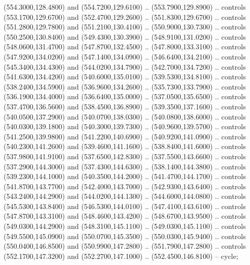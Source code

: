 {\begin{scope}[y=0.80pt, x=0.80pt, yscale=-1, xscale=1, inner sep=0pt, outer sep=0pt, #1]
      (554.3000,128.4800) and (554.7200,129.6100) .. (553.7900,129.8900) .. controls
      (553.1700,129.6700) and (552.4700,129.2600) .. (551.8300,129.6700) .. controls
      (551.2800,129.7800) and (551.2100,130.4100) .. (550.9000,130.7300) .. controls
      (550.2500,130.8400) and (549.4300,130.3900) .. (548.9100,131.0200) .. controls
      (548.0600,131.4700) and (547.8700,132.4500) .. (547.8000,133.3100) .. controls
      (547.9200,134.0200) and (547.1400,134.0900) .. (546.6400,134.2100) .. controls
      (545.3400,134.4300) and (544.0200,134.7900) .. (542.7000,134.7200) .. controls
      (541.6300,134.4200) and (540.6000,135.0100) .. (539.5300,134.8100) .. controls
      (538.2400,134.5900) and (536.9600,134.2600) .. (535.7300,133.7900) .. controls
      (536.1900,134.4000) and (536.6400,135.0000) .. (537.0500,135.6500) .. controls
      (537.4700,136.5600) and (538.4500,136.8900) .. (539.3500,137.1600) .. controls
      (540.0500,137.2900) and (540.0700,138.0300) .. (540.0800,138.6000) .. controls
      (540.0300,139.1800) and (540.3000,139.7300) .. (540.9600,139.5700) .. controls
      (541.2500,139.9800) and (541.2200,140.6900) .. (540.9200,141.0900) .. controls
      (540.2300,141.2600) and (539.4600,141.1600) .. (538.8400,141.6000) .. controls
      (537.9800,141.9100) and (537.6500,142.8300) .. (537.5500,143.6600) .. controls
      (537.2900,144.3000) and (537.4300,144.6300) .. (538.1400,144.3800) .. controls
      (539.2300,144.1000) and (540.3500,144.2000) .. (541.4700,144.1700) .. controls
      (541.8700,143.7700) and (542.4000,143.7000) .. (542.9300,143.6400) .. controls
      (543.2400,144.2900) and (544.0200,144.1300) .. (544.6000,144.0800) .. controls
      (545.5300,143.8400) and (546.5300,144.0100) .. (547.4100,143.6100) .. controls
      (547.8700,143.3100) and (548.4600,143.4200) .. (548.6700,143.9500) .. controls
      (549.0300,144.2900) and (548.3100,145.1100) .. (549.0300,145.1100) .. controls
      (549.5500,145.0900) and (550.0700,145.3500) .. (550.0300,145.9400) .. controls
      (550.0400,146.8500) and (550.9900,147.2800) .. (551.7900,147.2800) .. controls
      (552.1700,147.3200) and (552.2700,147.1000) .. (552.4500,146.8100) -- cycle;


\end{scope}}

